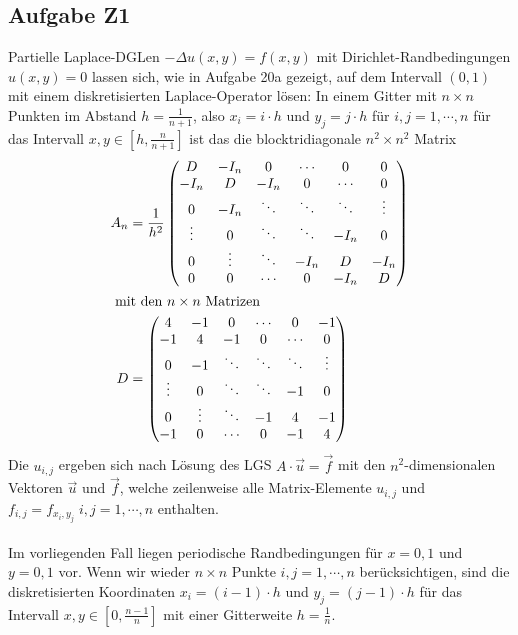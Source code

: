 \subsection*{Aufgabe Z1}
Partielle Laplace-DGLen $-\Delta u(x,y) = f(x,y)$ mit Dirichlet-Randbedingungen
$u(x,y) = 0$ lassen sich, wie in Aufgabe 20a gezeigt, auf dem Intervall $(0,1)$
mit einem diskretisierten Laplace-Operator lösen: In einem Gitter mit
$n \times n$ Punkten im Abstand $h = \frac{1}{n+1}$, also $x_i=i\cdot h$ und
$y_j = j \cdot h$ für $i, j = 1, \cdots, n$ für das Intervall
$x, y \in [h, \frac{n}{n+1}]$
ist das die blocktridiagonale $n^2 \times n^2$ Matrix
\begin{align}
\label{eq-A}
A_n&=\frac{1}{h^2} \begin{pmatrix}
D & -I_n & 0 & \cdots & 0 & 0\\
-I_n & D & -I_n & 0 & \cdots & 0\\
0 & -I_n& \ddots & \ddots & \ddots &\vdots\\
\vdots & 0 & \ddots& \ddots & -I_n & 0\\
0 & \vdots & \ddots & -I_n & D & -I_n\\
0 & 0 & \cdots & 0 & -I_n & D
\end{pmatrix} \\
\intertext{ mit den $n \times n$ Matrizen }
\label{eq-D}
D &=\begin{pmatrix}
4 & -1 & 0 & \cdots & 0 & -1\\
-1 & 4 & -1 & 0 &\cdots & 0\\
0 & -1 & \ddots & \ddots & \ddots & \vdots\\
\vdots & 0 & \ddots & \ddots &-1 & 0\\
0 & \vdots & \ddots & -1 & 4 & -1\\
-1 & 0 & \cdots & 0 & -1 & 4
\end{pmatrix}
\end{align}
Die $u_{i,j}$ ergeben sich nach Lösung des LGS $A \cdot \vec u = \vec f$
mit den $n^2$-dimensionalen Vektoren $\vec u $ und $\vec f$, welche zeilenweise
alle Matrix-Elemente $u_{i,j}$ und $f_{i, j} = f_{x_i, y_j} \; i, j = 1, \cdots, n$
enthalten.
\paragraph{}
Im vorliegenden Fall liegen periodische Randbedingungen für $x = 0, 1$ und  $y = 0, 1$ vor.
Wenn wir wieder $n \times n$ Punkte  $i, j = 1, \cdots, n$ berücksichtigen,
sind die diskretisierten Koordinaten $x_i=(i-1)\cdot h$ und $y_j = (j-1)\cdot h$
für das Intervall $x, y \in [0, \frac{n-1}{n}]$ mit einer Gitterweite $h = \frac{1}{n}$.

